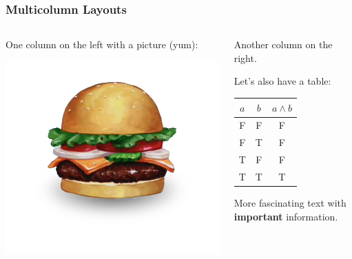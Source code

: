 \documentclass[aspectratio=43,sanserif,professionalfonts]{beamer}
\begin{document}
  \begin{frame}
    \frametitle{Multicolumn Layouts}
    
    \begin{columns}
      \begin{column}{0.45\textwidth}
        One column on the left with a picture (yum):
        
        \includegraphics[width=\textwidth]{img/krabby-patty}
      \end{column}
      \begin{column}{0.45\textwidth}
        Another column on the right.
        
        \vspace*{1.0em} %
        
        Let's also have a table:
        
        \vspace*{1.0em} %
        
        \begin{tabular}{cc|c}
          $a$ & $b$ & $a \land b$ \\ \hline
          F   & F   & F \\
          F   & T   & F \\
          T   & F   & F \\
          T   & T   & T
        \end{tabular}
        
        \vspace*{1.0em} %
        
        More fascinating text with \textbf{\color{rwth-blue}important} information.
      \end{column}
    \end{columns}
  \end{frame}
\end{document}
